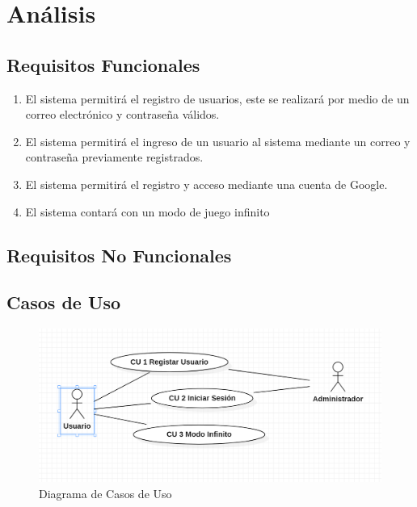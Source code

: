 \documentclass{article}
\begin{document}
\section{Análisis}
\subsection{Requisitos Funcionales}
\begin{enumerate}
\item {El sistema permitirá el registro de usuarios, este se realizará por medio de un correo electrónico y contraseña válidos.}
\item{El sistema permitirá el ingreso de un usuario al sistema mediante un correo y contraseña  previamente registrados.}
\item {El sistema permitirá el registro y acceso mediante una cuenta de Google.}
\item {El sistema contará con un modo de juego infinito}
\end{enumerate}
\subsection{Requisitos No Funcionales}
\subsection{Casos de Uso}
\begin{figure}[H]
    \centering
    \includegraphics[scale=0.9]{imgs/CasosDeUso}
    \caption{Diagrama de Casos de Uso}
\end{figure}
\end{document}

